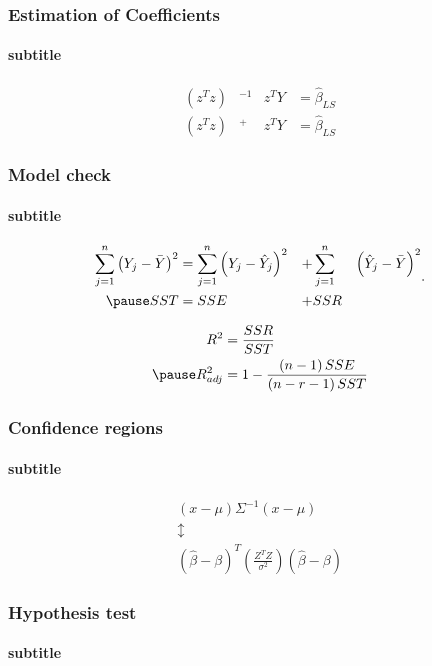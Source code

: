 \documentclass[aspectratio=169,10pt,t]{beamer}
\begin{document}
\begin{frame}[t]
	\frametitle{Estimation of Coefficients}
	\framesubtitle{subtitle}
	\[
		\begin{aligned}
			\left( z^{T} z  \right)& ^{-1} &z^{T} Y &= \hat{\beta}_{LS}\\
			\left( z^{T} z  \right)& ^{+} &z^{T} Y &= \hat{\beta}_{LS}
		\end{aligned}
	\] 
\end{frame}

\begin{frame}[t]
	\frametitle{Model check}
	\framesubtitle{subtitle}
	
	\[
		\begin{aligned}
			\sum^{n}_{j=1} 
			\left( Y_j -\bar{Y}   \right)^{2}
			&=
			\sum^{n}_{j=1}  \left( Y_j -\hat{Y}_{j}  \right) ^{2}
			&+
			&\sum^{n}_{j=1}&  \left( \hat{Y}_{j} - \bar{Y}  \right) ^{2} \\
			\pause
			SST &= SSE &+ &SSR
		\end{aligned}
	.\] 

	\[
	 \begin{aligned}
		 R^{2} &= \frac{SSR}{SST} \\
		 \pause
		 R^{2}_{adj} & = 1 - \frac{ \left( n-1 \right) SSE}{ \left( n-r-1 \right) SST} 
	 \end{aligned}
	\] 
\end{frame}

\begin{frame}[t]
	\frametitle{Confidence regions}
	\framesubtitle{subtitle}

	\[
	\begin{gathered}
		\left( x- \mu  \right) \Sigma^{-1}  \left( x- \mu \right) \\
													 \updownarrow\\
													 \left( \hat{\beta} - \beta \right) ^{T}
													 \left( \frac{Z^{T}Z}{\sigma^{2}}   \right) 
													 \left( \hat{\beta}  -\beta\right) 
	\end{gathered}
	\] 

\end{frame}

\begin{frame}[t]
	\frametitle{Hypothesis test}
	\framesubtitle{subtitle}
	
\end{frame}
\end{document}
